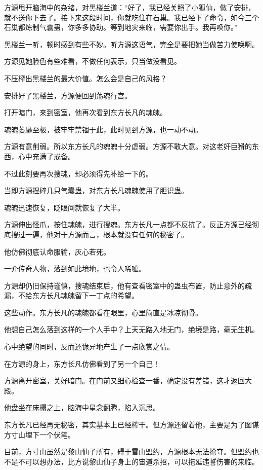 \begin{this_body}
方源甩开脑海中的杂绪，对黑楼兰道：“好了，我已经关照了小狐仙，做了安排，就不送你下去了。接下来这段时间，你就吃住在石巢。我已经下了命令，如今三个石巢都炼制气囊蛊，你多多协助。等到地灾来临，需要你出手。我再唤你。”

黑楼兰一听，顿时感到有些不妙。听方源这语气，完全是要把她当做苦力使唤啊。

方源见她脸色有些难看，不做任何表示，只当做没看见。

不压榨出黑楼兰的最大价值。怎么会是自己的风格？

安排好了黑楼兰，方源便回到荡魂行宫。

打开暗门，来到密室，他再次看到东方长凡的魂魄。

魂魄萎靡至极，被牢牢禁锢于此，此时见到方源，也一动不动。

方源有意削弱。所以东方长凡的魂魄十分虚弱。方源不敢大意。对这老奸巨猾的东西，心中充满了戒备。

不过此刻要再次搜魂，却必须得先补给一下的。

当即方源捏碎几只气囊蛊，对东方长凡魂魄使用了胆识蛊。

魂魄迅速恢复，眨眼间就恢复了大半。

方源伸出怪爪，按住魂魄，进行搜魂。东方长凡一点都不反抗了。反正方源已经彻底搜过一遍，他对于方源而言，根本就没有任何的秘密了。

他仿佛彻底认命服输，灰心若死。

一介传奇人物，落到如此境地，也令人唏嘘。

方源却仍旧保持谨慎，搜魂结束后，他有查看密室中的蛊虫布置，防止意外的疏漏，不给东方长凡魂魄留下一丁点的希望。

这些动作。东方长凡的魂魄都看在眼里，心里简直是冰凉彻骨。

他想自己怎么落到这样的一个人手中？上天无路入地无门，绝境是路，毫无生机。

心中绝望的同时，反而还诡异地产生了一点欣赏之情。

在方源的身上，东方长凡仿佛看到了另一个自己！

方源离开密室，关好暗门。在门前又细心检查一番，确定没有差错，这才返回大殿。

他盘坐在床榻之上，脑海中星念翻腾，陷入沉思。

东方长凡已经再无秘密，其实基本上已经榨干。但方源还留着他，主要是为了图谋方寸山埋下一个伏笔。

目前，方寸山虽然是黎山仙子所有，碍于雪山盟约，方源根本无法抢夺。但盟约也不是不可以想办法，比方说黎山仙子身上的宙道杀招，可以拖延违誓伤害的来临。


\end{this_body}
